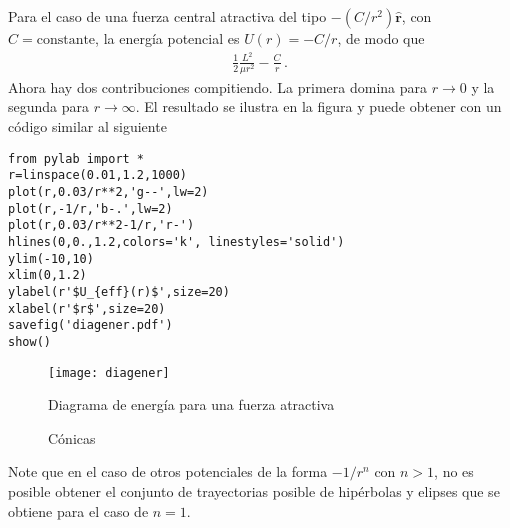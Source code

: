 Para el caso de una fuerza central atractiva del tipo $-(C/r^2)\hat{\mathbf{r}}$, con $C=\text{constante}$, la energía potencial es $U(r)=-C/r$, de modo que
\begin{align}
  \frac{1}{2}\frac{L^2}{\mu r^2}-\frac{C}{r}\,.
\end{align}
Ahora hay dos contribuciones compitiendo. La primera domina para $r\to 0$ y la segunda para $r\to \infty$. El resultado se ilustra en la figura y puede obtener con un código similar al siguiente
\begin{lstlisting}
from pylab import *
r=linspace(0.01,1.2,1000)
plot(r,0.03/r**2,'g--',lw=2)
plot(r,-1/r,'b-.',lw=2)
plot(r,0.03/r**2-1/r,'r-')
hlines(0,0.,1.2,colors='k', linestyles='solid')
ylim(-10,10)
xlim(0,1.2)
ylabel(r'$U_{eff}(r)$',size=20)
xlabel(r'$r$',size=20)
savefig('diagener.pdf')
show()
\end{lstlisting}
\begin{frame}
  
\begin{figure}
  \centering
  \texttt{[image: diagener]}
  \caption{Diagrama de energía para una fuerza atractiva}
  \label{fig:diagener}
\end{figure}
\end{frame}
\begin{frame}  
\begin{figure}
  \centering
  \caption{Cónicas}
  \label{fig:conicas}
\end{figure}
\end{frame}

Note que en el caso de otros potenciales de la forma $-1/r^n$ con $n>1$, no es posible obtener el conjunto de trayectorias posible de hipérbolas y elipses que se obtiene para el caso de $n=1$.


